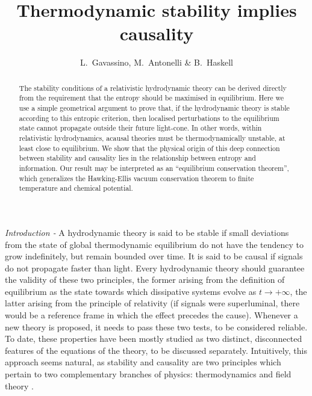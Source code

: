 \documentclass[aps,prl,reprint,nofootinbib]{revtex4-1}
\begin{document}
\title{Thermodynamic stability implies causality}
\author{L.~Gavassino, M.~Antonelli \& B.~Haskell}


\begin{abstract}
The stability conditions of a relativistic hydrodynamic theory can be derived directly from the requirement that the entropy should be maximised in equilibrium. Here we use a simple geometrical argument to prove that, if the hydrodynamic theory is stable according to this entropic criterion, then localised perturbations to the equilibrium state cannot propagate outside their future light-cone. In other words, within relativistic hydrodynamics, acausal theories must be thermodynamically unstable, at least close to equilibrium. We show that the physical origin of this deep connection between stability and causality lies in the relationship between entropy and information. Our result may be interpreted as an ``equilibrium conservation theorem'', which generalizes the Hawking-Ellis vacuum conservation theorem to finite temperature and chemical potential.  
\end{abstract} 

\maketitle

\textit{Introduction -} A hydrodynamic theory is said to be stable if small deviations from the state of global thermodynamic equilibrium do not have the tendency to grow indefinitely, but remain bounded over time. It is said to be causal if signals do not propagate faster than light.  Every hydrodynamic theory should guarantee the validity of these two principles, the former arising from the definition of equilibrium as the state towards which dissipative systems evolve as $t \rightarrow +\infty$, the latter arising from the principle of relativity (if signals were superluminal, there would be a reference frame in which the effect precedes the cause). Whenever a new theory is proposed, it needs to pass these two tests, to be considered reliable. To date, these properties have been mostly studied as two distinct, disconnected features of the equations of the theory, to be discussed separately. Intuitively, this approach seems natural, as stability and causality are two principles which pertain to two complementary branches of physics: thermodynamics \cite{PrigoginebookModernThermodynamics2014} and field theory \cite{Peskin_book}. 
\end{document}
